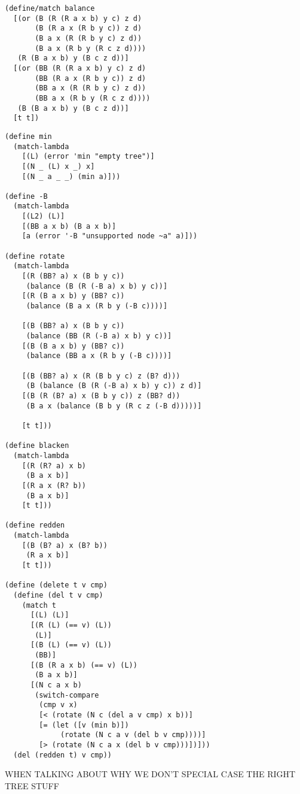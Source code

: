 \documentclass[preprint]{sigplanconf}
\begin{document}
\begin{verbatim}
(define/match balance
  [(or (B (R (R a x b) y c) z d)
       (B (R a x (R b y c)) z d)
       (B a x (R (R b y c) z d))
       (B a x (R b y (R c z d))))
   (R (B a x b) y (B c z d))]
  [(or (BB (R (R a x b) y c) z d)
       (BB (R a x (R b y c)) z d)
       (BB a x (R (R b y c) z d))
       (BB a x (R b y (R c z d))))
   (B (B a x b) y (B c z d))]
  [t t])
\end{verbatim}

\begin{verbatim}
(define min
  (match-lambda
    [(L) (error 'min "empty tree")]
    [(N _ (L) x _) x]
    [(N _ a _ _) (min a)]))

(define -B
  (match-lambda
    [(L2) (L)]
    [(BB a x b) (B a x b)]
    [a (error '-B "unsupported node ~a" a)]))

(define rotate
  (match-lambda
    [(R (BB? a) x (B b y c))
     (balance (B (R (-B a) x b) y c))]
    [(R (B a x b) y (BB? c))
     (balance (B a x (R b y (-B c))))]
    
    [(B (BB? a) x (B b y c))
     (balance (BB (R (-B a) x b) y c))]
    [(B (B a x b) y (BB? c))
     (balance (BB a x (R b y (-B c))))]
    
    [(B (BB? a) x (R (B b y c) z (B? d)))
     (B (balance (B (R (-B a) x b) y c)) z d)]
    [(B (R (B? a) x (B b y c)) z (BB? d))
     (B a x (balance (B b y (R c z (-B d)))))]
    
    [t t]))

(define blacken
  (match-lambda
    [(R (R? a) x b)
     (B a x b)]
    [(R a x (R? b))
     (B a x b)]
    [t t]))

(define redden
  (match-lambda
    [(B (B? a) x (B? b))
     (R a x b)]
    [t t]))

(define (delete t v cmp)
  (define (del t v cmp)
    (match t
      [(L) (L)]
      [(R (L) (== v) (L))
       (L)]
      [(B (L) (== v) (L))
       (BB)]
      [(B (R a x b) (== v) (L))
       (B a x b)]
      [(N c a x b)
       (switch-compare
        (cmp v x)
        [< (rotate (N c (del a v cmp) x b))]
        [= (let ([v (min b)])
             (rotate (N c a v (del b v cmp))))]
        [> (rotate (N c a x (del b v cmp)))])]))
  (del (redden t) v cmp))
\end{verbatim}

WHEN TALKING ABOUT WHY WE DON'T SPECIAL CASE THE RIGHT TREE STUFF
\end{document}
